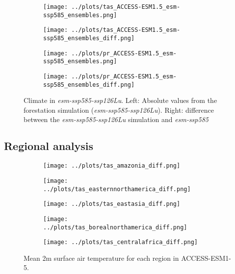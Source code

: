 \documentclass[]{article}
\begin{document}
\begin{figure}[H]
    \centering
    \begin{subfigure}[b]{0.45\linewidth}
        \texttt{[image: ../plots/tas\_ACCESS-ESM1.5\_esm-ssp585\_ensembles.png]}
    \end{subfigure}
    \begin{subfigure}[b]{0.45\linewidth}
        \texttt{[image: ../plots/tas\_ACCESS-ESM1.5\_esm-ssp585\_ensembles\_diff.png]}
    \end{subfigure}
    \begin{subfigure}[b]{0.45\linewidth}
        \texttt{[image: ../plots/pr\_ACCESS-ESM1.5\_esm-ssp585\_ensembles.png]}
    \end{subfigure}
    \begin{subfigure}[b]{0.45\linewidth}
        \texttt{[image: ../plots/pr\_ACCESS-ESM1.5\_esm-ssp585\_ensembles\_diff.png]}
    \end{subfigure}
    \caption{Climate in \textit{esm-ssp585-ssp126Lu}. Left: Absolute values from the forestation simulation (\textit{esm-ssp585-ssp126Lu}). Right: difference between the \textit{esm-ssp585-ssp126Lu} simulation and \textit{esm-ssp585}}
    \label{fig:climate}
\end{figure}

\subsection{Regional analysis}

\begin{figure}[H]
    \centering
    \begin{subfigure}[b]{0.4\linewidth}
        \texttt{[image: ../plots/tas\_amazonia\_diff.png]}
    \end{subfigure}
    \begin{subfigure}[b]{0.4\linewidth}
        \texttt{[image: ../plots/tas\_easternnorthamerica\_diff.png]}
    \end{subfigure}
    \begin{subfigure}[b]{0.4\linewidth}
        \texttt{[image: ../plots/tas\_eastasia\_diff.png]}
    \end{subfigure}
    \begin{subfigure}[b]{0.4\linewidth}
        \texttt{[image: ../plots/tas\_borealnorthamerica\_diff.png]}
    \end{subfigure}
    \begin{subfigure}[b]{0.4\linewidth}
        \texttt{[image: ../plots/tas\_centralafrica\_diff.png]}
    \end{subfigure}
    \caption{Mean 2m surface air temperature for each region in ACCESS-ESM1-5.}
    \label{fig:ACCESS_tas_regions}
\end{figure}
\end{document}
